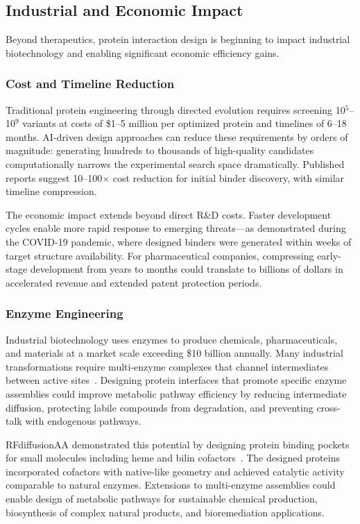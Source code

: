 \subsection{Industrial and Economic Impact}
\label{subsec:economic}

Beyond therapeutics, protein interaction design is beginning to impact industrial biotechnology and enabling significant economic efficiency gains.

\subsubsection{Cost and Timeline Reduction}

Traditional protein engineering through directed evolution requires screening 10$^5$--10$^9$ variants at costs of \$1--5 million per optimized protein and timelines of 6--18 months. AI-driven design approaches can reduce these requirements by orders of magnitude: generating hundreds to thousands of high-quality candidates computationally narrows the experimental search space dramatically. Published reports suggest 10--100$\times$ cost reduction for initial binder discovery, with similar timeline compression.

The economic impact extends beyond direct R\&D costs. Faster development cycles enable more rapid response to emerging threats---as demonstrated during the COVID-19 pandemic, where designed binders were generated within weeks of target structure availability. For pharmaceutical companies, compressing early-stage development from years to months could translate to billions of dollars in accelerated revenue and extended patent protection periods.

\subsubsection{Enzyme Engineering}

Industrial biotechnology uses enzymes to produce chemicals, pharmaceuticals, and materials at a market scale exceeding \$10 billion annually. Many industrial transformations require multi-enzyme complexes that channel intermediates between active sites~\cite{krishna2024rfaa}. Designing protein interfaces that promote specific enzyme assemblies could improve metabolic pathway efficiency by reducing intermediate diffusion, protecting labile compounds from degradation, and preventing cross-talk with endogenous pathways.

RFdiffusionAA demonstrated this potential by designing protein binding pockets for small molecules including heme and bilin cofactors~\cite{krishna2024rfaa}. The designed proteins incorporated cofactors with native-like geometry and achieved catalytic activity comparable to natural enzymes. Extensions to multi-enzyme assemblies could enable design of metabolic pathways for sustainable chemical production, biosynthesis of complex natural products, and bioremediation applications.

